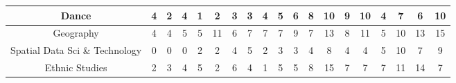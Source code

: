 \documentclass[10]{article}
\begin{document}
\begin{landscape}
\begin{longtable}[c]{|ccccccccccccccccccc|}
	\multicolumn{1}{|c|}{Dance}                                      & \multicolumn{1}{c|}{4}          & \multicolumn{1}{c|}{2}          & \multicolumn{1}{c|}{4}          & \multicolumn{1}{c|}{1}          & \multicolumn{1}{c|}{2}          & \multicolumn{1}{c|}{3}          & \multicolumn{1}{c|}{3}          & \multicolumn{1}{c|}{4}          & \multicolumn{1}{c|}{5}          & \multicolumn{1}{c|}{6}          & \multicolumn{1}{c|}{8}          & \multicolumn{1}{c|}{10}         & \multicolumn{1}{c|}{9}          & \multicolumn{1}{c|}{10}         & \multicolumn{1}{c|}{4}          & \multicolumn{1}{c|}{7}          & \multicolumn{1}{c|}{6}          & 10         \\ \hline
	\multicolumn{1}{|c|}{Geography}                                  & \multicolumn{1}{c|}{4}          & \multicolumn{1}{c|}{4}          & \multicolumn{1}{c|}{5}          & \multicolumn{1}{c|}{5}          & \multicolumn{1}{c|}{11}         & \multicolumn{1}{c|}{6}          & \multicolumn{1}{c|}{7}          & \multicolumn{1}{c|}{7}          & \multicolumn{1}{c|}{7}          & \multicolumn{1}{c|}{9}          & \multicolumn{1}{c|}{7}          & \multicolumn{1}{c|}{13}         & \multicolumn{1}{c|}{8}          & \multicolumn{1}{c|}{11}         & \multicolumn{1}{c|}{5}          & \multicolumn{1}{c|}{10}         & \multicolumn{1}{c|}{13}         & 15         \\ \hline
	\multicolumn{1}{|c|}{Spatial Data Sci \& Technology}             & \multicolumn{1}{c|}{0}          & \multicolumn{1}{c|}{0}          & \multicolumn{1}{c|}{0}          & \multicolumn{1}{c|}{2}          & \multicolumn{1}{c|}{2}          & \multicolumn{1}{c|}{4}          & \multicolumn{1}{c|}{5}          & \multicolumn{1}{c|}{2}          & \multicolumn{1}{c|}{3}          & \multicolumn{1}{c|}{3}          & \multicolumn{1}{c|}{4}          & \multicolumn{1}{c|}{8}          & \multicolumn{1}{c|}{4}          & \multicolumn{1}{c|}{4}          & \multicolumn{1}{c|}{5}          & \multicolumn{1}{c|}{10}         & \multicolumn{1}{c|}{7}          & 9          \\ \hline
	\multicolumn{1}{|c|}{Ethnic Studies}                             & \multicolumn{1}{c|}{2}          & \multicolumn{1}{c|}{3}          & \multicolumn{1}{c|}{4}          & \multicolumn{1}{c|}{5}          & \multicolumn{1}{c|}{2}          & \multicolumn{1}{c|}{6}          & \multicolumn{1}{c|}{4}          & \multicolumn{1}{c|}{1}          & \multicolumn{1}{c|}{5}          & \multicolumn{1}{c|}{5}          & \multicolumn{1}{c|}{8}          & \multicolumn{1}{c|}{15}         & \multicolumn{1}{c|}{7}          & \multicolumn{1}{c|}{7}          & \multicolumn{1}{c|}{7}          & \multicolumn{1}{c|}{11}         & \multicolumn{1}{c|}{14}         & 7          \\ \hline

\end{longtable}
\end{landscape}
\end{document}
